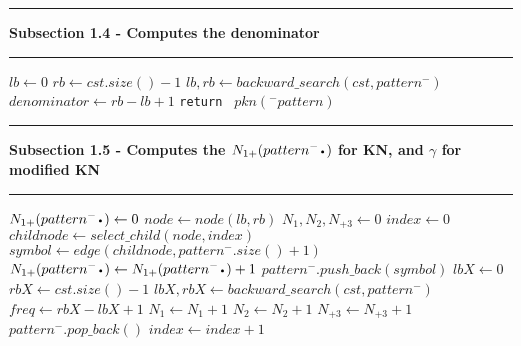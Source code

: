 \documentclass[11pt]{article}
\newcommand\Algphase[1]{%
\vspace*{-.7\baselineskip}\Statex\hspace*{\dimexpr-\algorithmicindent-2pt\relax}\rule{\textwidth}{0.1pt}%
\Statex\hspace*{-\algorithmicindent}\textbf{#1}%
\vspace*{-.7\baselineskip}\Statex\hspace*{\dimexpr-\algorithmicindent-2pt\relax}\rule{\textwidth}{0.1pt}%
}
\newcommand*{\LargerCdot}{\raisebox{-0.75ex}{\scalebox{2}{$\cdot$}}}
\begin{document}
\begin{algorithm*}
\begin{algorithmic}[1]
    \Algphase{ Subsection 1.4 - Computes the denominator}
	\State $lb\gets 0$
        \State $rb\gets cst.size()-1$
        \State $lb,rb\gets backward\_search(cst,pattern^{-})$
        \State $denominator\gets rb-lb+1$
		\State \texttt{return } $pkn(^{-}pattern)$
	\EndIf
    \Algphase{ Subsection 1.5 - Computes the $N_{1+}(pattern^{-}\LargerCdot)$ for KN, and $\gamma$ for modified KN}
    \State $N_{1+}(pattern^{-}\LargerCdot)\gets 0$
	\State $node\gets node(lb,rb)$
        \State $N_1,N_2,N_{+3}\gets 0$
		\State $index\gets 0$
			\State $childnode\gets select\_child(node,index)$
			\State $symbol\gets edge(childnode,pattern^{-}.size()+1)$
				\State $N_{1+}(pattern^{-}\LargerCdot)\gets N_{1+}(pattern^{-}\LargerCdot)+1$
			        \State $pattern^{-}.push\_back(symbol)$                       			                               \State $lbX\gets 0$
					\State $rbX\gets cst.size()-1$
					\State $lbX, rbX\gets backward\_search(cst,pattern^{-})$
					\State $freq\gets rbX-lbX+1$
					    \State $N_1\gets N_1 + 1$
					    \State $N_2\gets N_2 + 1$
					     \State $N_{+3}\gets N_{+3} + 1$
					\EndIf
					\State $pattern^{-}.pop\_back()$
       			\EndIf
			\EndIf
			\State $index\gets index+1$
		\EndWhile
\end{algorithmic}
\end{algorithm*}
\end{document}
